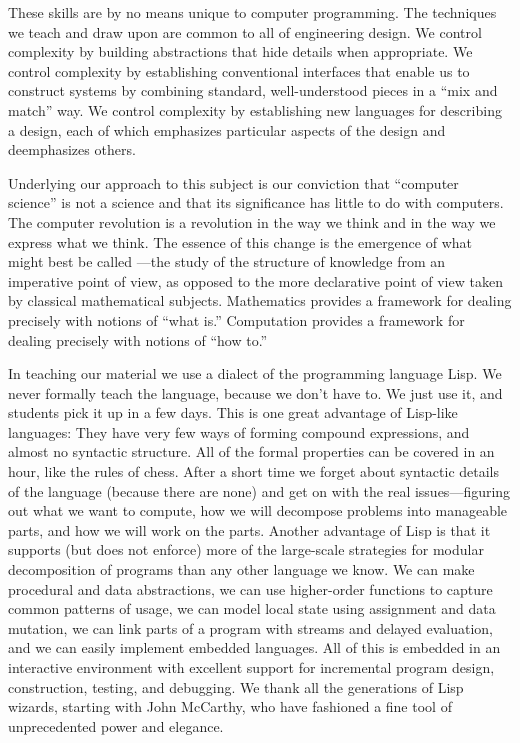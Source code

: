 These skills are by no means unique to computer programming.
The techniques we teach and draw upon are common to all of engineering design.
We control complexity by building abstractions that hide details when appropriate.
We control complexity by establishing conventional interfaces that enable us to construct systems by combining standard, well-understood pieces in a “mix and match” way.
We control complexity by establishing new languages for describing a design, each of which emphasizes particular aspects of the design and deemphasizes others.

Underlying our approach to this subject is our conviction that “computer science” is not a science and that its significance has little to do with computers.
The computer revolution is a revolution in the way we think and in the way we express what we think.
The essence of this change is the emergence of what might best be called ---the study of the structure of knowledge from an imperative point of view, as opposed to the
more declarative point of view taken by classical mathematical subjects.
Mathematics provides a framework for dealing precisely with notions of “what is.”
Computation provides a framework for dealing precisely with notions of “how to.”

In teaching our material we use a dialect of the programming language Lisp.
We never formally teach the language, because we don’t have to.
We just use it, and students pick it up in a few days.
This is one great advantage of Lisp-like languages:
They have very few ways of forming compound expressions, and almost no syntactic structure.
All of the formal properties can be covered in an hour, like the rules of chess.
After a short time we forget about syntactic details of the language (because there are none) and get on with the real issues---figuring out what we want to compute, how we will decompose problems into manageable parts, and how we will work on the parts.
Another advantage of Lisp is that it supports (but does not enforce) more of the large-scale strategies for modular decomposition of programs than any other language we know.
We can make procedural and data abstractions, we can use higher-order functions to capture common patterns of usage, we can model local state using assignment and data mutation, we can link parts of a program with streams and delayed evaluation, and we can easily implement embedded languages.
All of this is embedded in an interactive environment with excellent support for incremental program design, construction, testing, and debugging.
We thank all the generations of Lisp wizards, starting with John McCarthy, who have fashioned a fine tool of unprecedented power and elegance.

